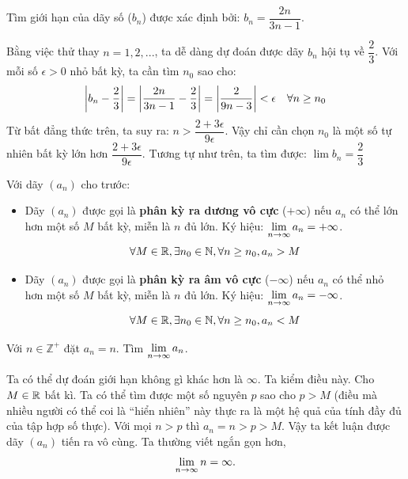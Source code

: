 \begin{example}
    Tìm giới hạn của dãy số ($b_n$) được xác định bởi: $b_n = \dfrac{2n}{3n - 1}$.

    \begin{solution}
        Bằng việc thử thay $n = 1, 2, ...$, ta dễ dàng dự đoán được dãy $b_n$ hội tụ về $\dfrac{2}{3}$. Với mỗi số $\epsilon > 0$ nhỏ bất kỳ, ta cần tìm $n_0$ sao cho:
        \[\left\lvert b_n - \dfrac{2}{3} \right\rvert = \left\lvert \dfrac{2n}{3n - 1} - \dfrac{2}{3} \right\rvert = \left\lvert \dfrac{2}{9n - 3} \right\rvert < \epsilon \quad \forall n \ge n_0\]
        Từ bất đẳng thức trên, ta suy ra: $n > \dfrac{2 + 3\epsilon}{9\epsilon}$. Vậy chỉ cần chọn $n_0$ là một số tự nhiên bất kỳ lớn hơn $\dfrac{2 + 3\epsilon}{9\epsilon}$. Tương tự như trên, ta tìm được: $\lim b_n = \dfrac{2}{3}$
    \end{solution}
\end{example}

\begin{definition}
Với dãy $(a_n)$ cho trước:
\begin{itemize}
    \item Dãy $(a_n)$ được gọi là \textbf{phân kỳ ra dương vô cực} ($+\infty$) nếu $a_n$ có thể lớn hơn một số $M$ bất kỳ, miễn là $n$ đủ lớn. Ký hiệu: $\lim\limits_{n \to \infty} a_n = +\infty$.
    \[ \forall M \in \mathbb{R}, \exists n_0 \in \mathbb{N}, \forall n \ge n_0, a_n > M \]
    \item Dãy $(a_n)$ được gọi là \textbf{phân kỳ ra âm vô cực} ($-\infty$) nếu $a_n$ có thể nhỏ hơn một số $M$ bất kỳ, miễn là $n$ đủ lớn. Ký hiệu: $\lim\limits_{n \to \infty} a_n = -\infty$.
    \[ \forall M \in \mathbb{R}, \exists n_0 \in \mathbb{N}, \forall n \ge n_0, a_n < M \]
\end{itemize}
\end{definition}

\begin{example}
	Với $n \in \mathbb{Z}^{+}$ đặt $a_n = n$. Tìm $\lim\limits_{n \to \infty} a_n$.
	\begin{solution}
		Ta có thể dự đoán giới hạn không gì khác hơn là $\infty$. Ta kiểm điều này. Cho $M \in \mathbb{R}$ bất kì. Ta có thể tìm được một số nguyên $p$ sao cho $p > M$ (điều mà nhiều người có thể coi là ``hiển nhiên'' này thực ra là một hệ quả của tính đầy đủ của tập hợp số thực). Với mọi $n > p$ thì $a_n = n > p > M$. Vậy ta kết luận được dãy $(a_n)$ tiến ra vô cùng. Ta thường viết ngắn gọn hơn,
		$$ \lim\limits_{n \to \infty} n = \infty. $$
	\end{solution}
\end{example}

